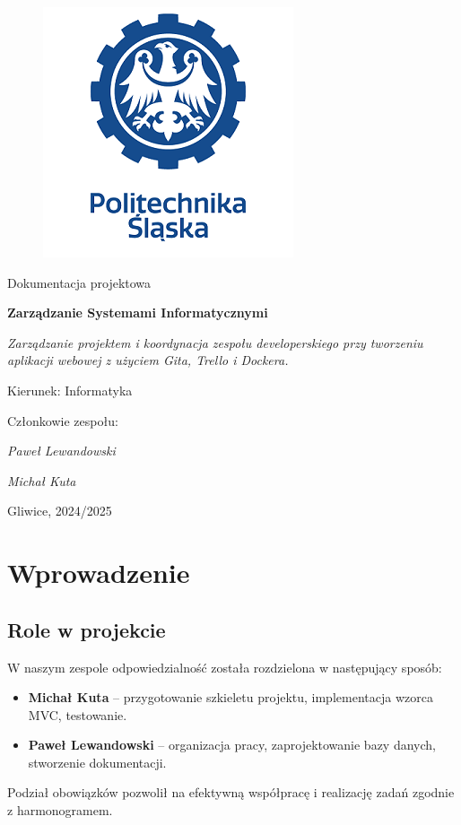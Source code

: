 \documentclass[12pt,a4paper]{article}
\def\projectName{Zarządzanie projektem i koordynacja zespołu developerskiego przy tworzeniu aplikacji webowej z użyciem Gita, Trello i Dockera.}
\def\authorA{Paweł Lewandowski}
\def\authorB{Michał Kuta}
\begin{document}
\clearpage
	\begin{figure}[h]
		\centering
		\includegraphics[width=0.5\linewidth]{media/ps-logo.png}
	\end{figure}

\hspace{3cm}
	\begin{center}Dokumentacja projektowa\end{center}
	\hspace{3cm}
	\begin{center}\large\textbf{Zarządzanie Systemami Informatycznymi}\end{center}
	\begin{center}\large\textit{\projectName}\end{center}

\hspace{7cm}
	\begin{flushright}Kierunek: Informatyka
		\end{flushright}
		\begin{flushright}Członkowie zespołu:
		\par
		\textit{\authorA}
		\par
		\textit{\authorB}
	\end{flushright}
\vfill
	\begin{center}Gliwice, 2024/2025\end{center}

\newpage
{}
\tableofcontents
\newpage

\section{Wprowadzenie}

\subsection{Role w projekcie}
W naszym zespole odpowiedzialność została rozdzielona w następujący sposób:
\begin{itemize}
	\item \textbf{Michał Kuta} -- przygotowanie szkieletu projektu, implementacja wzorca MVC, testowanie.
	\item \textbf{Paweł Lewandowski} -- organizacja pracy, zaprojektowanie bazy danych, stworzenie dokumentacji.
\end{itemize}
Podział obowiązków pozwolił na efektywną współpracę i realizację zadań zgodnie z harmonogramem.
\end{document}
